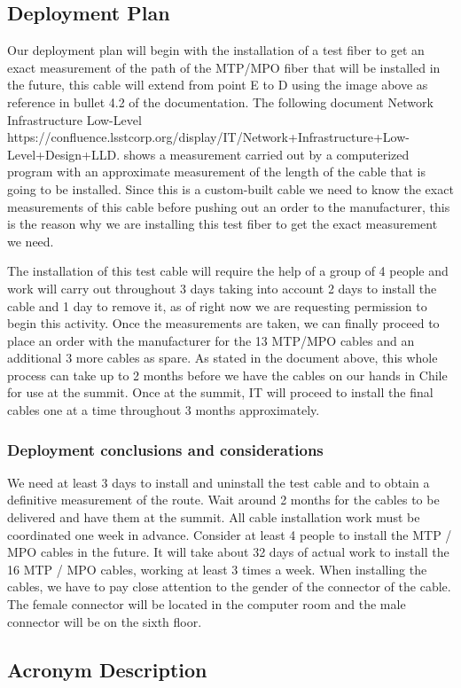 \subsection{Deployment Plan}

  Our deployment plan will begin with the installation of a test fiber to get an exact measurement of the path of the MTP/MPO fiber that will be installed in the future, this cable will extend from point E to D using the image above as reference in bullet 4.2 of the documentation. The following document Network Infrastructure Low-Level https://confluence.lsstcorp.org/display/IT/Network+Infrastructure+Low-Level+Design+LLD. shows a measurement carried out by a computerized program with an approximate measurement of the length of the cable that is going to be installed. Since this is a custom-built cable we need to know the exact measurements of this cable before pushing out an order to the manufacturer, this is the reason why we are installing this test fiber to get the exact measurement we need. 


  The installation of this test cable will require the help of a group of 4 people and work will carry out throughout 3 days taking into account 2 days to install the cable and 1 day to remove it, as of right now we are requesting permission to begin this activity. Once the measurements are taken, we can finally proceed to place an order with the manufacturer for the 13 MTP/MPO cables and an additional 3 more cables as spare. As stated in the document above, this whole process can take up to 2 months before we have the cables on our hands in Chile for use at the summit. Once at the summit, IT will proceed to install the final cables one at a time throughout 3 months approximately.

\subsubsection{Deployment conclusions and considerations}

  We need at least 3 days to install and uninstall the test cable and to obtain a definitive measurement of the route.
  Wait around 2 months for the cables to be delivered and have them at the summit.
  All cable installation work must be coordinated one week in advance.
  Consider at least 4 people to install the MTP / MPO cables in the future.
  It will take about 32 days of actual work to install the 16 MTP / MPO cables, working at least 3 times a week.
  When installing the cables, we have to pay close attention to the gender of the connector of the cable.  The female connector will be located in the computer room and the male connector will be on the sixth floor.

\subsection{Acronym Description}











